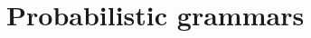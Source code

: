 \documentclass[t,usenames,dvipsnames]{beamer} %
\newcommand{\1}{\boldsymbol{1}}
\newcommand{\0}{\boldsymbol{0}}
\begin{document}



\section{Probabilistic grammars}
\end{document}
